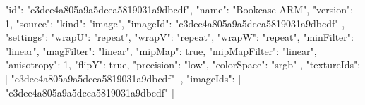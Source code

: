 {
  "id": "c3dee4a805a9a5dcea5819031a9dbcdf",
  "name": "Bookcase ARM",
  "version": 1,
  "source": {
    "kind": "image",
    "imageId": "c3dee4a805a9a5dcea5819031a9dbcdf"
  },
  "settings": {
    "wrapU": "repeat",
    "wrapV": "repeat",
    "wrapW": "repeat",
    "minFilter": "linear",
    "magFilter": "linear",
    "mipMap": true,
    "mipMapFilter": "linear",
    "anisotropy": 1,
    "flipY": true,
    "precision": "low",
    "colorSpace": "srgb"
  },
  "textureIds": [
    "c3dee4a805a9a5dcea5819031a9dbcdf"
  ],
  "imageIds": [
    "c3dee4a805a9a5dcea5819031a9dbcdf"
  ]
}
